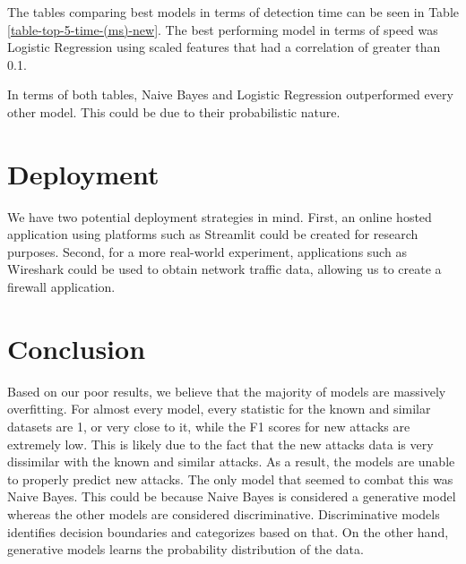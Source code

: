 
The tables comparing best models in terms of detection time can be seen in Table \ref{table-top-5-time-(ms)-new}. The best performing model in terms of speed was Logistic Regression using scaled features that had a correlation of greater than 0.1.



In terms of both tables, Naive Bayes and Logistic Regression outperformed every other model. This could be due to their probabilistic nature.





\section{Deployment}
We have two potential deployment strategies in mind. First, an online hosted application using platforms such as Streamlit could be created for research purposes. Second, for a more real-world experiment, applications such as Wireshark could be used to obtain network traffic data, allowing us to create a firewall application.



\section{Conclusion}

Based on our poor results, we believe that the majority of models are massively overfitting. For almost every model, every statistic for the known and similar datasets are 1, or very close to it, while the F1 scores for new attacks are extremely low. This is likely due to the fact that the new attacks data is very dissimilar with the known and similar attacks. As a result, the models are unable to properly predict new attacks. The only model that seemed to combat this was Naive Bayes. This could be because Naive Bayes is considered a generative model whereas the other models are considered discriminative. Discriminative models identifies decision boundaries and categorizes based on that. On the other hand, generative models learns the probability distribution of the data.

